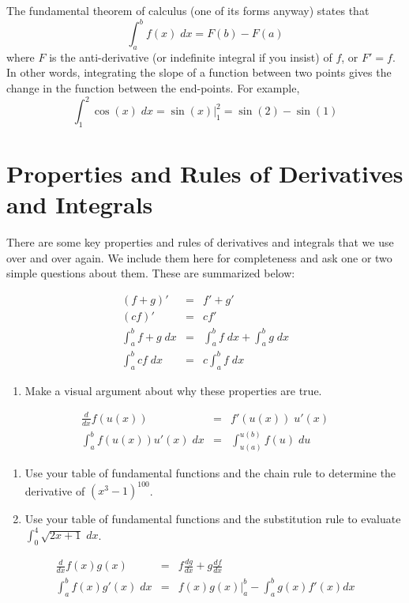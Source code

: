 \documentclass{tufte-handout}
\begin{document}
The fundamental theorem of calculus (one of its forms anyway) states that
\[ \int_a^b f(x) \; dx = F(b) - F(a) \]
where $F$ is the anti-derivative (or indefinite integral if you insist) of $f$, or $F' = f$. In other words, integrating the slope of a function between two points gives the change in the function between the end-points. For example,
\[\int_1^2 \cos(x) \; dx = \sin(x) |_1^2 = \sin(2) - \sin(1) \]

\section{Properties and Rules of Derivatives and Integrals}
There are some key properties and rules of derivatives and integrals that we use over and over again. We include them here for completeness and ask one or two simple questions about them. These are summarized below:

\begin{eqnarray*}
(f+g)' &=& f' + g' \\
(cf)' &=& cf' \\
\int_a^b f + g \; dx &=& \int_a^b f \; dx + \int_a^b g \; dx \\
\int_a^b cf \; dx &=& c \int_a^b f \; dx
\end{eqnarray*}

\begin{enumerate}[resume]
\item Make a visual argument about why these properties are true.
\end{enumerate}

\begin{eqnarray*}
\frac{d}{dx} f(u(x)) &=& f' (u(x)) \; u'(x) \\
\int_a^b f(u(x)) u'(x) \; dx &=& \int_{u(a)}^{u(b)} f(u) \; du
\end{eqnarray*}

\begin{enumerate}[resume]
\item Use your table of fundamental functions and the chain rule to determine the derivative of $(x^3-1)^{100}$.
\item Use your table of fundamental functions and the substitution rule to evaluate $\int_0^4 \sqrt{2x+1} \; dx$.
\end{enumerate}
 
\begin{eqnarray*}
\frac{d}{dx} f(x) g(x) &=& f \frac{dg}{dx} + g \frac{df}{dx} \\
\int_a^b f(x) g'(x) \; dx &=& f(x) g(x) |_a^b - \int_a^b g(x) f'(x) dx
\end{eqnarray*}
\end{document}

